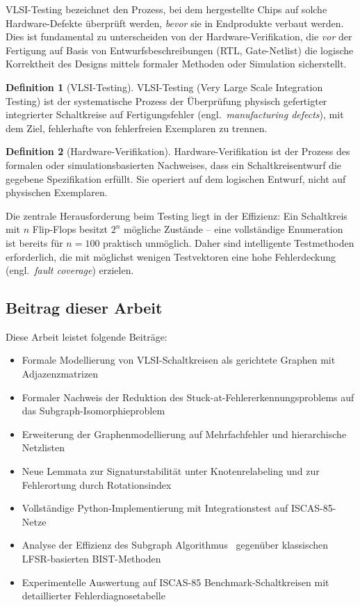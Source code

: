 ﻿\documentclass[a4paper,12pt]{article}
\theoremstyle{definition}
\newtheorem{definition}{Definition}
\begin{document}
VLSI-Testing bezeichnet den Prozess, bei dem hergestellte Chips auf solche
Hardware-Defekte überprüft werden, \emph{bevor} sie in Endprodukte verbaut
werden. Dies ist fundamental zu unterscheiden von der Hardware-Verifikation,
die \emph{vor} der Fertigung auf Basis von Entwurfs\-beschreibungen (RTL,
Gate-Netlist) die logische Korrektheit des Designs mittels formaler Methoden
oder Simulation sicherstellt.

\begin{definition}[VLSI-Testing]
  VLSI-Testing (Very Large Scale Integration Testing) ist der systematische
  Prozess der Über\-prüfung physisch gefertigter integrierter Schaltkreise
  auf Fertigungs\-fehler (engl.\ \emph{manufacturing defects}), mit dem Ziel,
  fehlerhafte von fehlerfreien Exemplaren zu trennen.
\end{definition}

\begin{definition}[Hardware-Verifikation]
  Hardware-Verifikation ist der Prozess des formalen oder
  simulations\-basierten Nachweises, dass ein Schaltkreis\-entwurf die
  gegebene Spezifikation erfüllt. Sie operiert auf dem logischen Entwurf,
  nicht auf physischen Exemplaren.
\end{definition}

Die zentrale Herausforderung beim Testing liegt in der Effizienz: Ein
Schaltkreis mit $n$ Flip-Flops besitzt $2^n$ mögliche Zustände -- eine
vollständige Enumeration ist bereits für $n = 100$ praktisch unmöglich.
Daher sind intelligente Testmethoden erforderlich, die mit möglichst wenigen
Testvektoren eine hohe Fehlerdeckung (engl.\ \emph{fault coverage}) erzielen.

\subsection{Beitrag dieser Arbeit}

Diese Arbeit leistet folgende Beiträge:

\begin{itemize}
  \item Formale Modellierung von VLSI-Schaltkreisen als gerichtete Graphen
        mit Adjazenz\-matrizen
  \item Formaler Nachweis der Reduktion des Stuck-at-Fehlererkennungs\-problems
        auf das Subgraph-Isomorphieproblem
  \item Erweiterung der Graphenmodellierung auf Mehrfachfehler und
        hierarchische Netzlisten
  \item Neue Lemmata zur Signaturstabilität unter Knotenrelabeling und zur
        Fehlerortung durch Rotationsindex
  \item Vollständige Python-Implementierung mit Integrations\-test auf
        ISCAS-85-Netze
  \item Analyse der Effizienz des Subgraph Algorithmus~\cite{epp2026subgraph}
        gegenüber klassischen LFSR-basierten BIST-Methoden
  \item Experimentelle Auswertung auf ISCAS-85 Benchmark-Schaltkreisen
        \cite{brglez1985combinational} mit detaillierter Fehlerdiagnosetabelle
\end{itemize}
\end{document}
